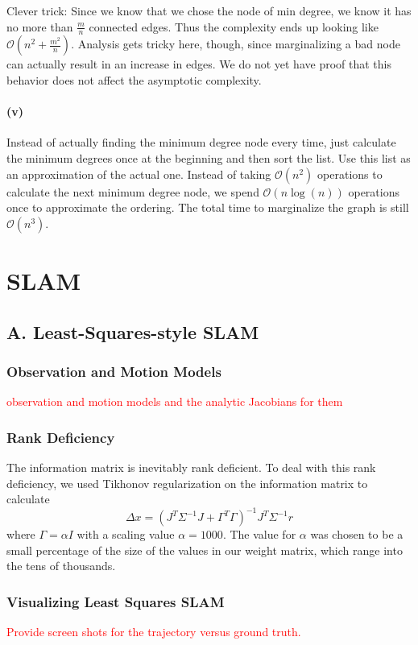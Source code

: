 \documentclass[12pt]{article}
\begin{document}
Clever trick: Since we know that we chose the node of min degree, we know it has
no more than $\frac{m}{n}$ connected edges. Thus the complexity ends up looking
like $\mathcal{O}(n^2 + \frac{m^2}{n})$. Analysis gets tricky here, though,
since marginalizing a bad node can actually result in an increase in edges. We
do not yet have proof that this behavior does not affect the asymptotic
complexity.

\paragraph{(v)}
Instead of actually finding the minimum degree node every time, just calculate
the minimum degrees once at the beginning and then sort the list. Use this list
as an approximation of the actual one. Instead of taking $\mathcal{O}(n^2)$
operations to calculate the next minimum degree node, we spend
$\mathcal{O}(n\log(n))$ operations once to approximate the ordering. The total
time to marginalize the graph is still $\mathcal{O}(n^3)$.

\section{SLAM}

\subsection*{A. Least-Squares-style SLAM}

\subsubsection*{Observation and Motion Models}
\textcolor{red}{observation and motion models and the analytic Jacobians for them}

\subsubsection*{Rank Deficiency}
The information matrix is inevitably rank deficient.  To deal with this rank deficiency, we used Tikhonov regularization on the information matrix to calculate
$$\Delta x = (J^T \Sigma^{-1}J + \Gamma^T \Gamma)^{-1}J^T \Sigma^{-1} r$$
where $\Gamma = \alpha I$ with a scaling value $\alpha = 1000$.  The value for $\alpha$ was chosen to be a small percentage of the size of the values in our weight matrix, which range into the tens of thousands.


\subsubsection*{Visualizing Least Squares SLAM}
\textcolor{red}{Provide screen shots for the trajectory versus ground truth.}
\end{document}
